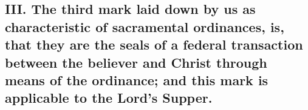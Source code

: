 \documentclass[]{book}
\begin{document}
\hypertarget{iii.-the-third-mark-laid-down-by-us-as-characteristic-of-sacramental-ordinances-is-that-they-are-the-seals-of-a-federal-transaction-between-the-believer-and-christ-through-means-of-the-ordinance-and-this-mark-is-applicable-to-the-lords-supper.}{%
\subsection{III. The third mark laid down by us as characteristic of sacramental ordinances, is, that they are the seals of a federal transaction between the believer and Christ through means of the ordinance; and this mark is applicable to the Lord's Supper.}\label{iii.-the-third-mark-laid-down-by-us-as-characteristic-of-sacramental-ordinances-is-that-they-are-the-seals-of-a-federal-transaction-between-the-believer-and-christ-through-means-of-the-ordinance-and-this-mark-is-applicable-to-the-lords-supper.}}
\end{document}

